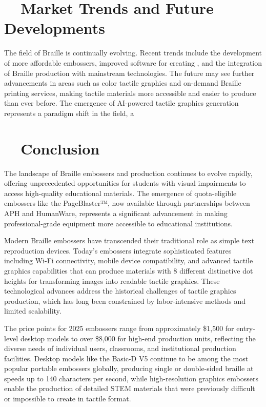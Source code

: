 \section{~~Market Trends and Future Developments}\label{ch4:sec:market-trends}

The field of Braille  is continually evolving. Recent trends include the development of more affordable embossers, improved software for creating , and the integration of Braille production with mainstream technologies.\supercite{DuxburyNews, PerkinsTouchMapper} The future may see further advancements in areas such as color tactile graphics and on-demand Braille printing services, making tactile materials more accessible and easier to produce than ever before. The emergence of AI-powered tactile graphics generation represents a paradigm shift in the field, a

\section{~~Conclusion}\label{ch4:sec:conclusion}

The landscape of Braille embossers and  production continues to evolve rapidly, offering unprecedented opportunities for students with visual impairments to access high-quality educational materials. The emergence of quota-eligible embossers like the PageBlaster™, now available through partnerships between APH and HumanWare, represents a significant advancement in making professional-grade equipment more accessible to educational institutions.

Modern Braille embossers have transcended their traditional role as simple text reproduction devices. Today's embossers integrate sophisticated features including Wi-Fi connectivity, mobile device compatibility, and advanced tactile graphics capabilities that can produce materials with 8 different distinctive dot heights for transforming images into readable tactile graphics. These technological advances address the historical challenges of tactile graphics production, which has long been constrained by labor-intensive methods and limited scalability.

The price points for 2025 embossers range from approximately \$1,500 for entry-level desktop models to over \$8,000 for high-end production units, reflecting the diverse needs of individual users, classrooms, and institutional production facilities. Desktop models like the Basic-D V5 continue to be among the most popular portable embossers globally, producing single or double-sided braille at speeds up to 140 characters per second, while high-resolution graphics embossers enable the production of detailed STEM materials that were previously difficult or impossible to create in tactile format.

